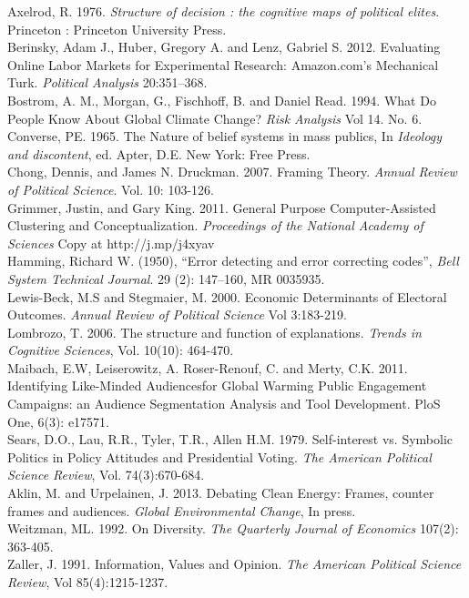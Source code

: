 \documentclass[12pt]{article}
\begin{document}
Axelrod, R. 1976. \textit{Structure of decision : the cognitive maps of political elites}. Princeton : Princeton University Press.
\\

Berinsky, Adam J., Huber, Gregory A. and Lenz, Gabriel S. 2012. Evaluating Online Labor Markets for Experimental Research: Amazon.com’s Mechanical Turk. \textit{Political Analysis} 20:351–368.
\\

Bostrom, A. M., Morgan, G., Fischhoff, B. and Daniel Read. 1994. What Do People Know About Global Climate Change? \textit{Risk Analysis} Vol 14. No. 6.
\\

Converse, PE. 1965. The Nature of belief systems in mass publics, In \textit{Ideology and discontent}, ed. Apter, D.E. New York: Free Press.
\\

Chong, Dennis, and James N. Druckman. 2007. Framing Theory. \textit{Annual Review of Political Science}. Vol. 10: 103-126.
\\

Grimmer, Justin, and Gary King. 2011. General Purpose Computer-Assisted Clustering and Conceptualization. \textit{Proceedings of the National Academy of Sciences} Copy at http://j.mp/j4xyav
\\

Hamming, Richard W. (1950), ``Error detecting and error correcting codes'', \textit{Bell System Technical Journal}. 29 (2): 147–160, MR 0035935.
\\

Lewis-Beck, M.S and Stegmaier, M. 2000. Economic Determinants of Electoral Outcomes. \textit{Annual Review of Political Science} Vol 3:183-219.
\\

Lombrozo, T. 2006. The structure and function of explanations. \textit{Trends in Cognitive Sciences}, Vol. 10(10): 464-470.
\\

Maibach, E.W, Leiserowitz, A. Roser-Renouf, C. and Merty, C.K. 2011. Identifying Like-Minded Audiencesfor Global Warming Public Engagement Campaigns: an Audience Segmentation Analysis and Tool Development. PloS One, 6(3): e17571.
\\

Sears, D.O., Lau, R.R., Tyler, T.R., Allen H.M. 1979. Self-interest vs. Symbolic Politics in Policy Attitudes and Presidential Voting. \textit{The American Political Science Review}, Vol. 74(3):670-684.
\\

Aklin, M. and Urpelainen, J. 2013. Debating Clean Energy: Frames, counter frames and audiences. \textit{Global Environmental Change}, In press.
\\

Weitzman, ML. 1992. On Diversity. \textit{The Quarterly Journal of Economics} 107(2): 363-405.
\\

Zaller, J. 1991. Information, Values and Opinion. \textit{The American Political Science Review}, Vol 85(4):1215-1237.
    
\end{document}
